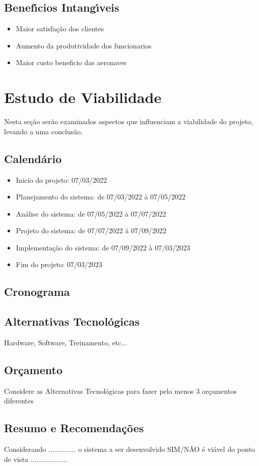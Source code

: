\subsection{Benef\'{\i}cios Intang\'{\i}veis}
\begin{itemize}
       \item Maior satisfação dos clientes
       \item Aumento da produtividade dos funcionarios
       \item Maior custo beneficio das aeronaves
\end{itemize}


\section{Estudo de Viabilidade}
Nesta seção serão examinados aspectos que influenciam a viabilidade do projeto, levando a uma
conclusão.

\subsection{Calend\'{a}rio }
\begin{itemize}
       \item Inicio do projeto: 07/03/2022
       \item Planejamento do sistema: de 07/03/2022 à 07/05/2022
       \item Análise do sistema: de 07/05/2022 à 07/07/2022
       \item Projeto do sistema: de 07/07/2022 à 07/09/2022
       \item Implementação do sistema: de 07/09/2022 à 07/03/2023
       \item Fim do projeto: 07/03/2023
\end{itemize}


\subsection{Cronograma }

\subsection{Alternativas Tecnol\'{o}gicas }
Hardware, Software, Treinamento, etc...

\subsection{Or\c{c}amento }
Considere as Alternativas Tecnol\'{o}gicas para fazer pelo menos 3 or\c{c}amentos diferentes



\subsection{Resumo e Recomenda\c{c}\~{o}es}

Considerando .............. o sistema a ser desenvolvido SIM/N\~{A}O \'{e} vi\'{a}vel do ponto de vista ...................
